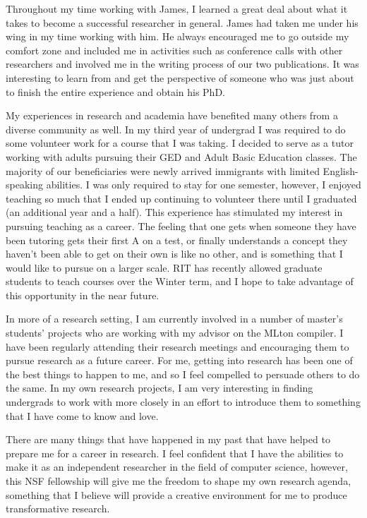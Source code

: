 \documentclass[12pt]{article}
\begin{document}
Throughout my time working with James, I learned a great deal about what it takes to become a successful researcher in general. James had taken me under his wing in my time working with him. He always encouraged me to go outside my comfort zone and included me in activities such as conference calls with other researchers and involved me in the writing process of our two publications. It was interesting to learn from and get the perspective of someone who was just about to finish the entire experience and obtain his PhD.

My experiences in research and academia have benefited many others from a diverse community as well. In my third year of undergrad I was required to do some volunteer work for a course that I was taking. I decided to serve as a tutor working with adults pursuing their GED and Adult Basic Education classes. The majority of our beneficiaries were newly arrived immigrants with limited English-speaking abilities. I was only required to stay for one semester, however, I enjoyed teaching so much that I ended up continuing to volunteer there until I graduated (an additional year and a half). This experience has stimulated my interest in pursuing teaching as a career. The feeling that one gets when someone they have been tutoring gets their first A on a test, or finally understands a concept they haven't been able to get on their own is like no other, and is something that I would like to pursue on a larger scale.  RIT has recently allowed graduate students to teach courses over the Winter term, and I hope to take advantage of this opportunity in the near future.  

In more of a research setting, I am currently involved in a number of master's students' projects who are working with my advisor on the MLton compiler.  I have been regularly attending their research meetings and encouraging them to pursue research as a future career.  For me, getting into research has been one of the best things to happen to me, and so I feel compelled to persuade others to do the same. In my own research projects, I am very interesting in finding undergrads to work with more closely in an effort to introduce them to something that I have come to know and love.

There are many things that have happened in my past that have helped to prepare me for a career in research. I feel confident that I have the abilities to make it as an independent researcher in the field of computer science, however, this NSF fellowship will give me the freedom to shape my own research agenda, something that I believe will provide a creative environment for me to produce transformative research.
\end{document}
